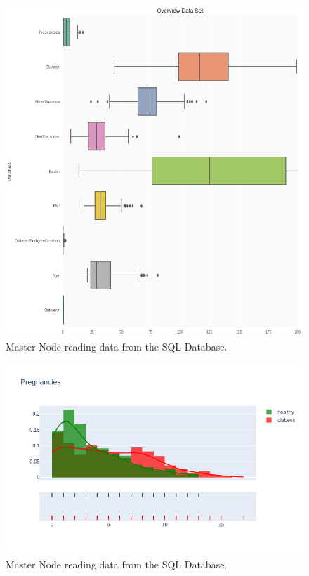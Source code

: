 \documentclass[12pt]{article}
\begin{document}
\begin{figure}[ht]
\centering
\includegraphics[width=1\textwidth]{download.png}
\caption{Master Node reading data from the SQL Database.}
\end{figure}

\begin{figure}[ht]
\centering
\includegraphics[width=1\textwidth]{newplot(10).png}
\caption{Master Node reading data from the SQL Database.}
\end{figure}
\end{document}
